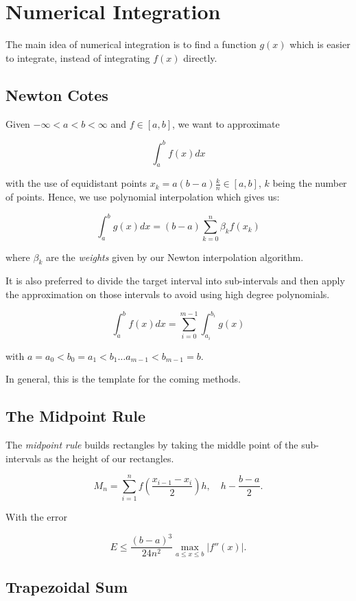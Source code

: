 \chapter{Numerical Integration}

The main idea of numerical integration is to find a function \(g(x)\) which is easier to integrate, instead 
of integrating \(f(x)\) directly.

\section{Newton Cotes}

Given \(- \infty < a < b < \infty \) and \(f \in [a,b]\), we want to approximate 

\[
    \int_a^b f(x) dx
\]

with the use of equidistant points \(x_k = a(b - a)\frac{k}{n} \in [a, b]\), \(k\) being the number of points.
Hence, we use polynomial interpolation which gives us: 

\[
    \int_a^b g(x) dx = (b - a) \sum_{k = 0}^{n} \beta_k f(x_k)
\]

where \(\beta_k\) are the \emph{weights} given by our Newton interpolation algorithm.

It is also preferred to divide the target interval into sub-intervals and then apply the approximation on those intervals to avoid 
using high degree polynomials.


\[
    \int_a^b f(x) dx = \sum_{i = 0}^{m - 1} \int_{a_i}^{b_i} g(x)
\]

with \(a = a_0 < b_0 = a_1 < b_1 \dots a_{m - 1} < b_{m - 1} = b\).

In general, this is the template for the coming methods.

\section{The Midpoint Rule}

The \emph{midpoint rule} builds rectangles by taking the middle point of the sub-intervals as the 
height of our rectangles.

\[
    M_n = \sum_{i = 1}^n f\left(\frac{x_{i - 1} - x_i}{2}\right) h, \quad h - \frac{b - a}{2}.
\]

With the error 

\[
    E \le \frac{(b - a)^3}{24 n^2} \max_{a \le x \le b}|f''(x)|.
\]

\section{Trapezoidal Sum}

